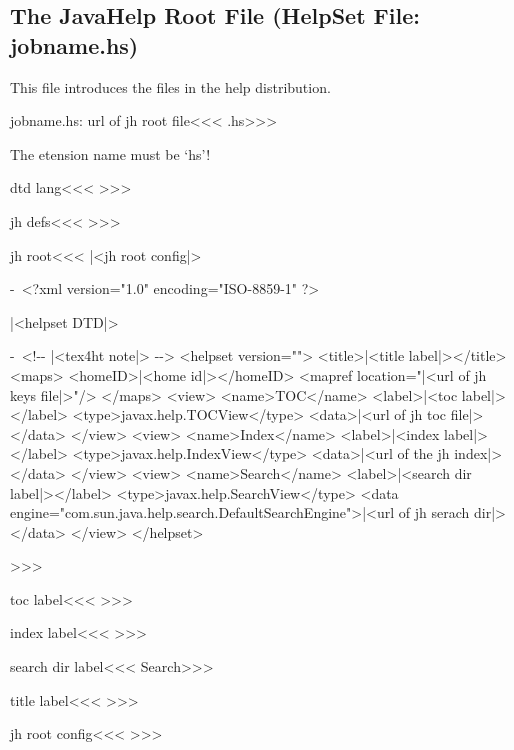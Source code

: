 \subsection{The JavaHelp Root File (HelpSet File: jobname.hs)}

This file introduces the files in the help distribution.


\<jobname.hs: url of jh root file\><<<
\jobname.hs>>>


The etension name must be `hs'!



\<dtd lang\><<<
\dTdLaNg>>>

\<jh defs\><<<
\def\dTdLaNg{\expandafter
  \ifx \csname a:dtd-lang\endcsname\relax EN\else
    \csname a:dtd-lang\endcsname
  \fi   }
>>>

\<jh root\><<<
|<jh root config|>
\IgnorePar\par\leavevmode{}%
\begin{dito}-\
<?xml version="1.0" encoding="ISO-8859-1" ?>
\end{dito}
|<helpset DTD|>
\begin{dito}-\
<!-\relax- |<tex4ht note|> -\relax->
<helpset version="\dotVersion">
  <title>|<title label|></title>
  <maps>
    <homeID>|<home id|></homeID>
    <mapref location="|<url of jh keys file|>"/>
  </maps>
  <view>
    <name>TOC</name>
    <label>|<toc label|></label>
    <type>javax.help.TOCView</type>
    <data>|<url of jh toc file|></data>
  </view>
  <view>
    <name>Index</name>
    <label>|<index label|></label>
    <type>javax.help.IndexView</type>
    <data>|<url of the jh index|></data>
  </view>
  <view>
    <name>Search</name>
    <label>|<search dir label|></label>
    <type>javax.help.SearchView</type>
    <data 
      engine="com.sun.java.help.search.DefaultSearchEngine">|<url of jh serach dir|></data>
  </view>
</helpset>
\end{dito}
\IgnorePar\par\leavevmode{}
>>>



\<toc label\><<<
\tocLabel>>>

\<index label\><<<
\indexLabel>>>

\<search dir label\><<<
Search>>>

\<title label\><<<
\titleLabel>>>


\<jh root config\><<<
\edef\tocLabel{\ifx\contentsname\:UnDef Table Of Contents\else
               \ifx\contentsname\empty  Table Of Contents\else 
               \contentsname\fi\fi}
\edef\indexLabel{\ifx\indexname\:UnDef Index\else
                 \ifx\indexname\empty  Index\else \indexname\fi\fi}
\ifTag{TITLE+}
   {\edef\titleLabel{\LikeRef{TITLE+}}}
   {\def\titleLabel{\jobname}}
>>>



